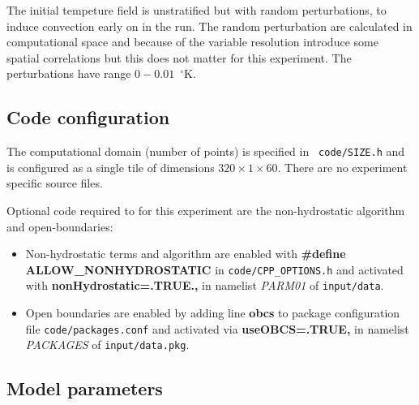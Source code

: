 The initial tempeture field is unstratified but with random
perturbations, to induce convection early on in the run. The random
perturbation are calculated in computational space and because of the
variable resolution introduce some spatial correlations but this does
not matter for this experiment. The perturbations have range
$0-0.01$~$^{\circ}\mathrm{K}$.

\subsection{Code configuration}
\label{www:tutorials}
\label{sect:plume-config}

The computational domain (number of points) is specified in {\tt
code/SIZE.h} and is configured as a single tile of dimensions
$320\times1\times60$. There are no experiment specific source files.

Optional code required to for this experiment are the non-hydrostatic
algorithm and open-boundaries:
\begin{itemize}
\item Non-hydrostatic terms and algorithm are enabled with {\bf
\#define ALLOW\_NONHYDROSTATIC} in {\tt code/CPP\_OPTIONS.h} and
activated with {\bf nonHydrostatic=.TRUE.,} in namelist {\em PARM01}
of {\tt input/data}.
\item Open boundaries are enabled by adding line {\bf obcs} to 
package configuration file
{\tt code/packages.conf} and activated via {\bf useOBCS=.TRUE,} in
namelist {\em PACKAGES} of {\tt input/data.pkg}.
\end{itemize}

\subsection{Model parameters}
\label{www:tutorials}
\label{sect:plume-params}

